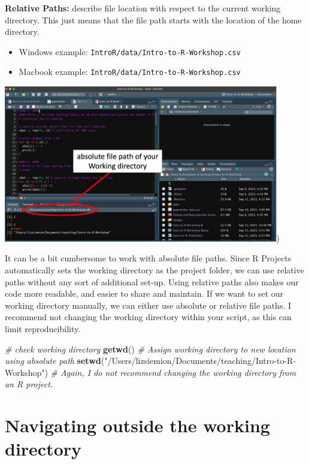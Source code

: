 \documentclass[
]{book}
\newenvironment{Shaded}{\begin{snugshade}}{\end{snugshade}}
\newcommand{\CommentTok}[1]{\textcolor[rgb]{0.56,0.35,0.01}{\textit{#1}}}
\newcommand{\FunctionTok}[1]{\textcolor[rgb]{0.13,0.29,0.53}{\textbf{#1}}}
\newcommand{\NormalTok}[1]{#1}
\newcommand{\StringTok}[1]{\textcolor[rgb]{0.31,0.60,0.02}{#1}}
\providecommand{\tightlist}{%
  \setlength{\itemsep}{0pt}\setlength{\parskip}{0pt}}
\begin{document}
\textbf{Relative Paths:} describe file location with respect to the current working directory. This just means that the file path starts with the location of the home directory.

\begin{itemize}
\tightlist
\item
  Windows example:
  \texttt{IntroR/data/Intro-to-R-Workshop.csv}
\item
  Macbook example:
  \texttt{IntroR/data/Intro-to-R-Workshop.csv}
\end{itemize}

\includegraphics[width=0.9\textwidth,height=\textheight]{./docs/files/RProjectFilePath.png})

It can be a bit cumbersome to work with absolute file paths. Since R Projects automatically sets the working directory as the project folder, we can use relative paths without any sort of additional set-up. Using relative paths also makes our code more readable, and easier to share and maintain. If we want to set our working directory manually, we can either use absolute or relative file paths. I recommend not changing the working directory within your script, as this can limit reproducibility.

\begin{Shaded}
\begin{Highlighting}[]
\CommentTok{\# check working directory}
\FunctionTok{getwd}\NormalTok{() }
\CommentTok{\# Assign working directory to new location using absolute path}
\FunctionTok{setwd}\NormalTok{(}\StringTok{"/Users/lizsiemion/Documents/teaching/Intro{-}to{-}R{-}Workshop"}\NormalTok{)}
\CommentTok{\# Again, I do not recommend changing the working directory from an R project.}
\end{Highlighting}
\end{Shaded}

\section{Navigating outside the working directory}\label{navigating-outside-the-working-directory}
\end{document}
